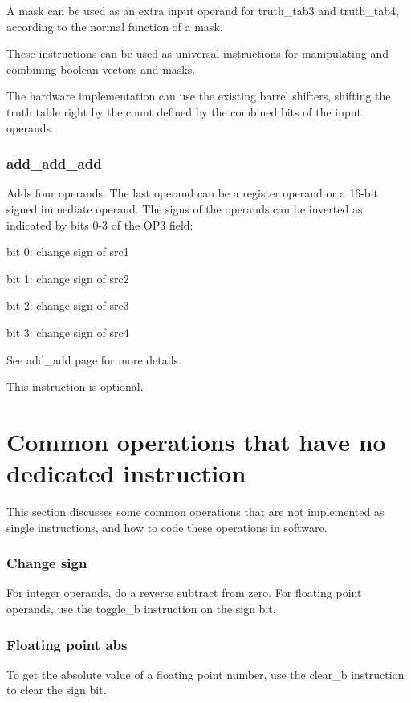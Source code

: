 \documentclass[forwardcom.tex]{subfiles}
\begin{document}
A mask can be used as an extra input operand for truth\_tab3 and truth\_tab4, according to the normal function of a mask.
\vspace{2mm}

These instructions can be used as universal instructions for manipulating and combining boolean vectors and masks.
\vspace{2mm}

The hardware implementation can use the existing barrel shifters, shifting the truth table right by the count defined by the combined bits of the input operands.


\subsubsection{add\_add\_add} \label{addAddAdd}
Adds four operands. The last operand can be a register operand or a 16-bit signed immediate operand. The signs of the operands can be inverted as indicated by bits 0-3 of the OP3 field:
\vspace{2mm}

bit 0: change sign of src1

bit 1: change sign of src2

bit 2: change sign of src3

bit 3: change sign of src4
\vspace{2mm}

See add\_add page \pageref{addAdd} for more details.
\vspace{2mm}

This instruction is optional.


\section{Common operations that have no dedicated instruction}
This section discusses some common operations that are not implemented as single instructions, and how to code these operations in software.

\subsubsection{Change sign}
For integer operands, do a reverse subtract from zero. For floating point operands, use the toggle\_b instruction on the sign bit.

\subsubsection{Floating point abs}
To get the absolute value of a floating point number, use the clear\_b instruction to clear the sign bit.
\end{document}
